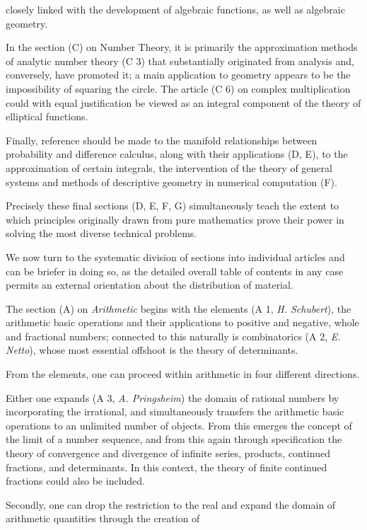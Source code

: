 \thispagestyle{fancy}

\vspace{0.5cm}

closely linked with the development of algebraic functions, as well as algebraic geometry.

In the section (C) on Number Theory, it is primarily the approximation methods of analytic number theory (C 3) that substantially originated from analysis and, conversely, have promoted it; a main application to geometry appears to be the impossibility of squaring the circle. The article (C 6) on complex multiplication could with equal justification be viewed as an integral component of the theory of elliptical functions.

Finally, reference should be made to the manifold relationships between probability and difference calculus, along with their applications (D, E), to the approximation of certain integrals, the intervention of the theory of general systems and methods of descriptive geometry in numerical computation (F).

Precisely these final sections (D, E, F, G) simultaneously teach the extent to which principles originally drawn from pure mathematics prove their power in solving the most diverse technical problems.

We now turn to the systematic division of sections into individual articles and can be briefer in doing so, as the detailed overall table of contents in any case permits an external orientation about the distribution of material.

The section (A) on \textit{Arithmetic} begins with the elements (A 1, \textit{H. Schubert}), the arithmetic basic operations and their applications to positive and negative, whole and fractional numbers; connected to this naturally is combinatorics (A 2, \textit{E. Netto}), whose most essential offshoot is the theory of determinants.

From the elements, one can proceed within arithmetic in four different directions.

Either one expands (A 3, \textit{A. Pringsheim}) the domain of rational numbers by incorporating the irrational, and simultaneously transfers the arithmetic basic operations to an unlimited number of objects. From this emerges the concept of the limit of a number sequence, and from this again through specification the theory of convergence and divergence of infinite series, products, continued fractions, and determinants. In this context, the theory of finite continued fractions could also be included.

Secondly, one can drop the restriction to the real and expand the domain of arithmetic quantities through the creation of
